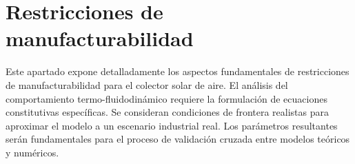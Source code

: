 \section{Restricciones de manufacturabilidad}
\label{sec:cap05_restricciones}

Este apartado expone detalladamente los aspectos fundamentales de restricciones de manufacturabilidad para el colector solar de aire.
El análisis del comportamiento termo-fluidodinámico requiere la formulación de ecuaciones constitutivas específicas.
Se consideran condiciones de frontera realistas para aproximar el modelo a un escenario industrial real.
Los parámetros resultantes serán fundamentales para el proceso de validación cruzada entre modelos teóricos y numéricos.
